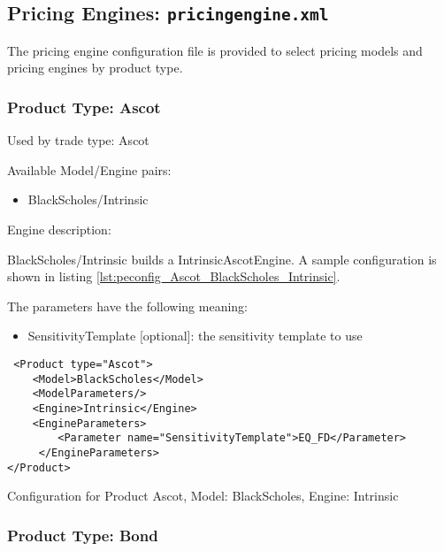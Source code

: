 \subsection{Pricing Engines: {\tt pricingengine.xml}}
\label{sec:configuration_pricingengines}

The pricing engine configuration file is provided to select pricing models and pricing engines by product type.

\subsubsection{Product Type: Ascot}

Used by trade type: Ascot

Available Model/Engine pairs:

\begin{itemize}
\item BlackScholes/Intrinsic
\end{itemize}

Engine description:

BlackScholes/Intrinsic builds a IntrinsicAscotEngine. A sample configuration is shown
in listing \ref{lst:peconfig_Ascot_BlackScholes_Intrinsic}.

The parameters have the following meaning:

\begin{itemize}
\item SensitivityTemplate [optional]: the sensitivity template to use 
\end{itemize}

\begin{longlisting}
\begin{verbatim}
 <Product type="Ascot">
    <Model>BlackScholes</Model>
    <ModelParameters/>
    <Engine>Intrinsic</Engine>
    <EngineParameters>
        <Parameter name="SensitivityTemplate">EQ_FD</Parameter>
     </EngineParameters>
</Product>
\end{verbatim}
\caption{Configuration for Product Ascot, Model: BlackScholes, Engine: Intrinsic}
\label{lst:peconfig_Ascot_BlackScholes_Intrinsic}
\end{longlisting}

\subsubsection{Product Type: Bond}

